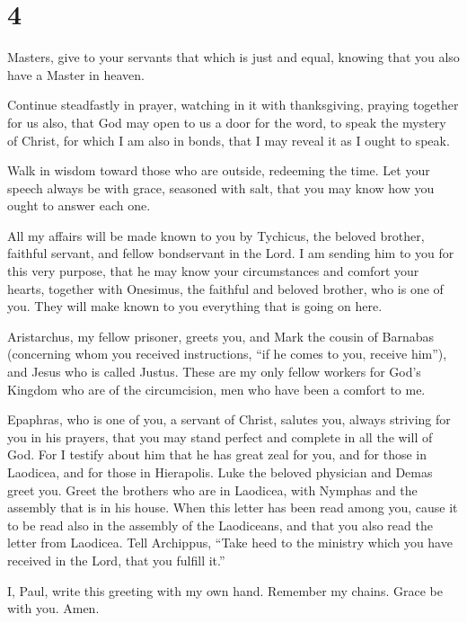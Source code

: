 \hypertarget{section-3}{%
\section{4}\label{section-3}}

 Masters, give to your servants that which is just and
equal, knowing that you also have a Master in heaven.

 Continue steadfastly in prayer, watching in it with
thanksgiving,  praying together for us also, that God may
open to us a door for the word, to speak the mystery of Christ, for
which I am also in bonds,  that I may reveal it as I ought
to speak.

 Walk in wisdom toward those who are outside, redeeming the
time.  Let your speech always be with grace, seasoned with
salt, that you may know how you ought to answer each one.

 All my affairs will be made known to you by Tychicus, the
beloved brother, faithful servant, and fellow bondservant in the Lord.
 I am sending him to you for this very purpose, that he may
know your circumstances and comfort your hearts,  together
with Onesimus, the faithful and beloved brother, who is one of you. They
will make known to you everything that is going on here.

 Aristarchus, my fellow prisoner, greets you, and Mark the
cousin of Barnabas (concerning whom you received instructions, ``if he
comes to you, receive him''),  and Jesus who is called
Justus. These are my only fellow workers for God's Kingdom who are of
the circumcision, men who have been a comfort to me.

 Epaphras, who is one of you, a servant of Christ, salutes
you, always striving for you in his prayers, that you may stand perfect
and complete in all the will of God.  For I testify about
him that he has great zeal for you, and for those in Laodicea, and for
those in Hierapolis.  Luke the beloved physician and Demas
greet you.  Greet the brothers who are in Laodicea, with
Nymphas and the assembly that is in his house.  When this
letter has been read among you, cause it to be read also in the assembly
of the Laodiceans, and that you also read the letter from Laodicea.
 Tell Archippus, ``Take heed to the ministry which you have
received in the Lord, that you fulfill it.''

 I, Paul, write this greeting with my own hand. Remember my
chains. Grace be with you. Amen.
